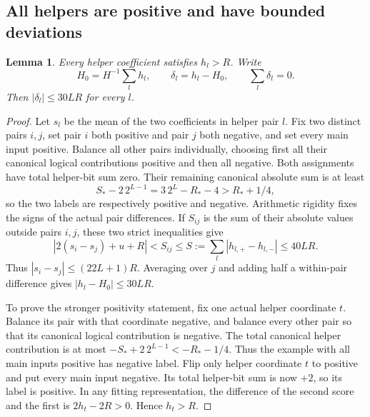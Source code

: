 \documentclass[11pt]{article}
\newtheorem{lemma}[theorem]{Lemma}
\begin{document}
\subsection{All helpers are positive and have bounded deviations}

\begin{lemma}\label{lem:helpers}
Every helper coefficient satisfies $h_l>R$. Write
\[
 H_0=H^{-1}\sum_lh_l,\qquad \delta_l=h_l-H_0,\qquad\sum_l\delta_l=0.
\]
Then $|\delta_l|\le30LR$ for every $l$.
\end{lemma}
\begin{proof}
Let $s_l$ be the mean of the two coefficients in helper pair $l$.
Fix two distinct pairs $i,j$, set pair $i$ both positive and pair $j$
both negative, and set every main input positive. Balance all other
pairs individually, choosing first all their canonical logical
contributions positive and then all negative. Both assignments have
total helper-bit sum zero. Their remaining canonical absolute sum is
at least
\[
 S_*-2\,2^{L-1}=3\,2^L-R_*-4>R_*+1/4,
\]
so the two labels are respectively positive and negative.
Arithmetic rigidity fixes the signs of the actual pair differences.
If $S_{ij}$ is the sum of their absolute values outside pairs $i,j$,
these two strict inequalities give
\[
 |2(s_i-s_j)+u+R|<S_{ij}\le S:=\sum_l|h_{l,+}-h_{l,-}|\le40LR.
\]
Thus $|s_i-s_j|\le(22L+1)R$. Averaging over $j$ and adding half a
within-pair difference gives $|h_l-H_0|\le30LR$.

To prove the stronger positivity statement, fix one actual helper
coordinate $t$. Balance its pair with that coordinate negative, and
balance every other pair so that its canonical logical contribution is
negative. The total canonical helper contribution is at most
$-S_*+2\,2^{L-1}<-R_*-1/4$. Thus the example with all main inputs
positive has negative label. Flip only helper coordinate $t$ to positive
and put every main input negative. Its total helper-bit sum is now $+2$,
so its label is positive. In any fitting representation, the difference
of the second score and the first is $2h_t-2R>0$. Hence $h_t>R$.
\end{proof}
\end{document}
